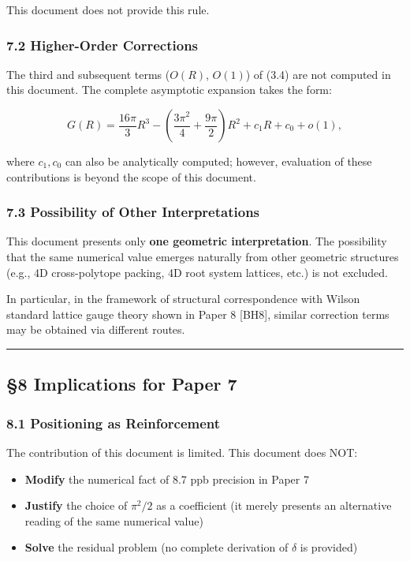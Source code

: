 \documentclass[
]{article}
\providecommand{\tightlist}{%
  \setlength{\itemsep}{0pt}\setlength{\parskip}{0pt}}
\begin{document}
This document does not provide this rule.

\subsubsection{7.2 Higher-Order
Corrections}\label{higher-order-corrections}

The third and subsequent terms (\(O(R)\), \(O(1)\)) of (3.4) are not
computed in this document. The complete asymptotic expansion takes the
form:

\[G(R) = \frac{16\pi}{3}R^3 - \left(\frac{3\pi^2}{4} + \frac{9\pi}{2}\right)R^2 + c_1 R + c_0 + o(1),\]

where \(c_1, c_0\) can also be analytically computed; however,
evaluation of these contributions is beyond the scope of this document.

\subsubsection{7.3 Possibility of Other
Interpretations}\label{possibility-of-other-interpretations}

This document presents only \textbf{one geometric interpretation}. The
possibility that the same numerical value emerges naturally from other
geometric structures (e.g., 4D cross-polytope packing, 4D root system
lattices, etc.) is not excluded.

In particular, in the framework of structural correspondence with Wilson
standard lattice gauge theory shown in Paper 8 {[}BH8{]}, similar
correction terms may be obtained via different routes.

\begin{center}\rule{0.5\linewidth}{0.5pt}\end{center}

\subsection{§8 Implications for Paper 7}\label{implications-for-paper-7}

\subsubsection{8.1 Positioning as
Reinforcement}\label{positioning-as-reinforcement}

The contribution of this document is limited. This document does NOT:

\begin{itemize}
\tightlist
\item
  \textbf{Modify} the numerical fact of 8.7 ppb precision in Paper 7
\item
  \textbf{Justify} the choice of \(\pi^2/2\) as a coefficient (it merely
  presents an alternative reading of the same numerical value)
\item
  \textbf{Solve} the residual problem (no complete derivation of
  \(\delta\) is provided)
\end{itemize}
\end{document}
